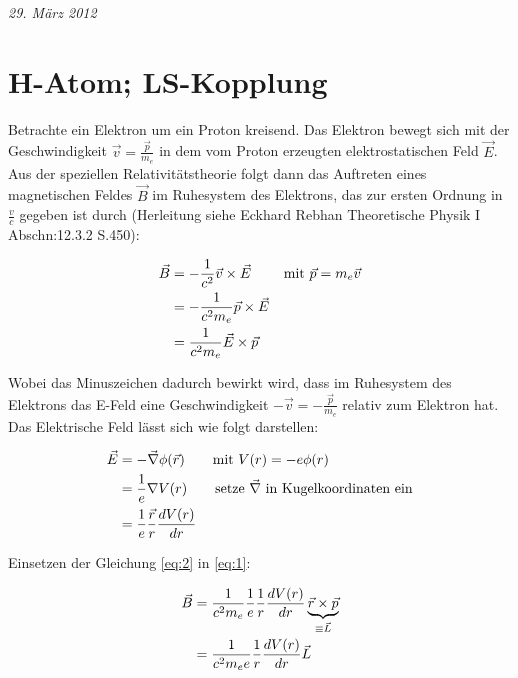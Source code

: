
\usepackage{amsmath} 



\textit{29. März 2012}


\section*{H-Atom; LS-Kopplung}

Betrachte ein Elektron um ein Proton kreisend. Das Elektron bewegt sich mit der Geschwindigkeit \(\vec v=\frac{\vec p}{m_e}\) in dem vom Proton erzeugten elektrostatischen Feld \(\vec E\). Aus der speziellen Relativitätstheorie folgt dann das Auftreten eines magnetischen Feldes \(\vec B\) im Ruhesystem des Elektrons, das zur ersten Ordnung in \(\frac{v}{c}\) gegeben ist durch (Herleitung siehe Eckhard Rebhan Theoretische Physik I Abschn:12.3.2 S.450):

\begin{align}
  \vec B &= -\frac{1}{c^2}\vec v\times \vec E \qquad \text{ mit } \vec p = m_e\vec v \notag \\
&= -\frac{1}{c^2 m_e}\vec p\times \vec E \notag \\
&= \frac{1}{c^2 m_e}\vec E\times \vec p  \label{eq:1}
\end{align}

Wobei das Minuszeichen dadurch bewirkt wird, dass im Ruhesystem des Elektrons das E-Feld eine Geschwindigkeit \(-\vec v = -\frac{\vec p}{m_e}\) relativ zum Elektron hat. Das Elektrische Feld lässt sich wie folgt darstellen:

\begin{align}
  \label{eq:2}
  \vec E &= -\vec\nabla\phi(\vec r) \qquad \text{mit } V(r) = -e\phi(r)  \notag \\
&= \frac{1}{e} \nabla V(r) \qquad \text{setze }\vec\nabla\text{ in Kugelkoordinaten ein}\notag \\
 &= \frac{1}{e}\frac{\vec r}{r} \frac{dV(r)}{dr}
\end{align}

Einsetzen der Gleichung \eqref{eq:2} in \eqref{eq:1}:

\begin{align}
  \label{eq:3}
\vec B  &= \frac{1}{c^2 m_e} \frac{1}{e}\frac{1}{r} \frac{dV(r)}{dr}\underbrace{ \vec r \times \vec p}_{\equiv \vec L} \notag\\
&= \frac{1}{c^2 m_e e}\frac{1}{r} \frac{dV(r)}{dr}\vec L
\end{align}


